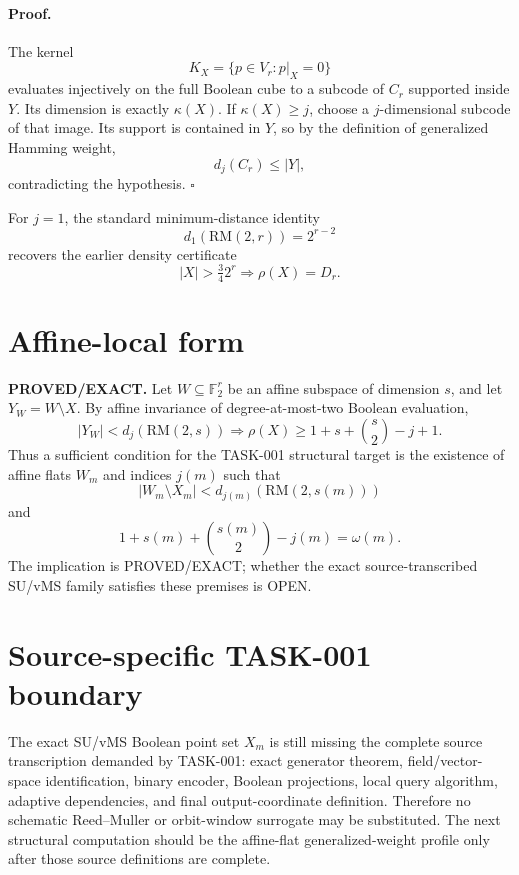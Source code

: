 \documentclass[11pt]{article}
\begin{document}
\paragraph{Proof.}
The kernel
\[
 K_X=\{p\in V_r:p|_X=0\}
\]
evaluates injectively on the full Boolean cube to a subcode of \(C_r\) supported inside \(Y\).  Its dimension is exactly \(\kappa(X)\).  If \(\kappa(X)\ge j\), choose a \(j\)-dimensional subcode of that image.  Its support is contained in \(Y\), so by the definition of generalized Hamming weight,
\[
 d_j(C_r)\le |Y|,
\]
contradicting the hypothesis. \(\square\)

For \(j=1\), the standard minimum-distance identity
\[
 d_1(\mathrm{RM}(2,r))=2^{r-2}
\]
recovers the earlier density certificate
\[
 |X|>\tfrac34 2^r\Longrightarrow \rho(X)=D_r.
\]

\section*{Affine-local form}
\textbf{PROVED/EXACT.}
Let \(W\subseteq\mathbb F_2^r\) be an affine subspace of dimension \(s\), and let \(Y_W=W\setminus X\).  By affine invariance of degree-at-most-two Boolean evaluation,
\[
 |Y_W|<d_j(\mathrm{RM}(2,s))
 \Longrightarrow
 \rho(X)\ge 1+s+\binom s2-j+1.
\]
Thus a sufficient condition for the TASK-001 structural target is the existence of affine flats \(W_m\) and indices \(j(m)\) such that
\[
 |W_m\setminus X_m|<d_{j(m)}(\mathrm{RM}(2,s(m)))
\]
and
\[
 1+s(m)+\binom{s(m)}2-j(m)=\omega(m).
\]
The implication is PROVED/EXACT; whether the exact source-transcribed SU/vMS family satisfies these premises is OPEN.

\section*{Source-specific TASK-001 boundary}
The exact SU/vMS Boolean point set \(X_m\) is still missing the complete source transcription demanded by TASK-001: exact generator theorem, field/vector-space identification, binary encoder, Boolean projections, local query algorithm, adaptive dependencies, and final output-coordinate definition.  Therefore no schematic Reed--Muller or orbit-window surrogate may be substituted.  The next structural computation should be the affine-flat generalized-weight profile only after those source definitions are complete.
\end{document}
